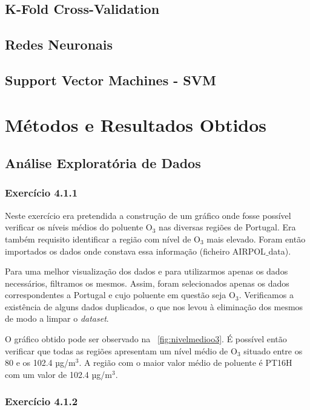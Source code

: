 \documentclass[conference]{IEEEtran}
\begin{document}
\subsection{K-Fold Cross-Validation}


\subsection{Redes Neuronais}

\subsection{Support Vector Machines - SVM}


\section{Métodos e Resultados Obtidos}

\subsection{Análise Exploratória de Dados}
\medskip
\subsubsection{\textbf{Exercício 4.1.1}}

Neste exercício era pretendida a construção de um gráfico onde fosse possível verificar os níveis médios do poluente O$_3$ nas diversas regiões de Portugal. Era também requisito identificar a região com nível de O$_3$ mais elevado. Foram então importados os dados onde constava essa informação (ficheiro AIRPOL$\_$data).  

Para uma melhor visualização dos dados e para utilizarmos apenas os dados necessários, filtramos os mesmos. Assim, foram selecionados apenas os dados correspondentes a Portugal e cujo poluente em questão seja O$_3$. Verificamos a existência de alguns dados duplicados, o que nos levou à eliminação dos mesmos de modo a limpar o \textit{dataset}.
 
O gráfico obtido pode ser observado na \figurename~\ref{fig:nivelmedioo3}. É possível então verificar que todas as regiões apresentam um nível médio de O$_3$ situado entre os 80 e os 102.4 µg/m$^3$. A região com o maior valor médio de poluente é PT16H com um valor de 102.4 µg/m$^3$.


\medskip
\subsubsection{\textbf{Exercício 4.1.2}}
\end{document}
